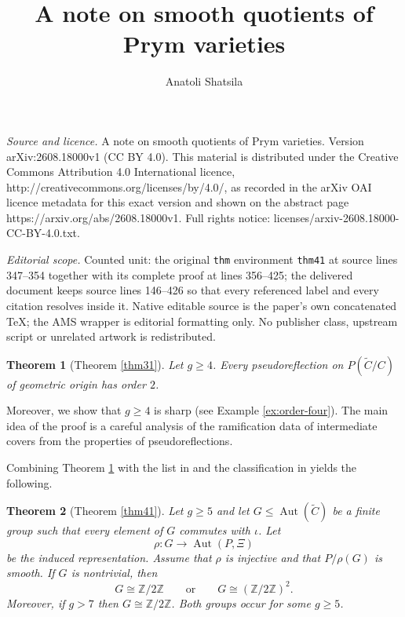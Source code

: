 \documentclass[10pt,a4paper]{amsart}
\newtheorem{thm}{Theorem}[section]
\numberwithin{equation}{section}
\newcommand{\ZZ}{\mathbb Z}
\DeclareMathOperator{\Aut}{Aut}
\begin{document}
\title[A note on smooth quotients of Prym varieties]{A note on smooth quotients of Prym varieties}
\author{Anatoli Shatsila}
\date{}
\maketitle
\noindent\emph{Source and licence.} A note on smooth quotients of Prym varieties. Version arXiv:2608.18000v1 (CC BY 4.0). This material is distributed under the Creative Commons Attribution 4.0 International licence, http://creativecommons.org/licenses/by/4.0/, as recorded in the arXiv OAI licence metadata for this exact version and shown on the abstract page https://arxiv.org/abs/2608.18000v1. Full rights notice: licenses/arxiv-2608.18000-CC-BY-4.0.txt.\par\smallskip
\noindent\textit{Editorial scope.} Counted unit: the original \texttt{thm} environment \texttt{thm41} at source lines 347--354 together with its complete proof at lines 356--425; the delivered document keeps source lines 146--426 so that every referenced label and every citation resolves inside it. Native editable source is the paper's own concatenated TeX; the AMS wrapper is editorial formatting only. No publisher class, upstream script or unrelated artwork is redistributed.
\begin{thm}[Theorem \ref{thm31}]\label{thm:order-two}
Let $g\geq4$. Every pseudoreflection on $P(\widetilde C/C)$ of geometric origin has order $2$.
\end{thm}

Moreover, we show that $g \geq 4$ is sharp (see Example \ref{ex:order-four}). The main idea of the proof is a careful analysis of the ramification data of intermediate covers from the properties of pseudoreflections.  

Combining Theorem \ref{thm:order-two} with the list in \cite[Proposition 5.1]{ALN} and the classification in \cite[Theorem 3.5]{ALA} yields the following.

\begin{thm}[Theorem \ref{thm41}]\label{thm:main}
Let $g\geq5$ and let $G\leq \Aut(\widetilde C)$ be a finite group such that every element of $G$ commutes with $\iota$. Let
\[
\rho\colon G\longrightarrow \Aut(P,\Xi)
\]
be the induced representation. Assume that $\rho$ is injective and that $P/\rho(G)$ is smooth. If $G$ is nontrivial, then $$ G\cong \ZZ/2\ZZ \qquad\text{or}\qquad G\cong (\ZZ/2\ZZ)^2.$$
Moreover, if $g > 7$ then $G\cong \ZZ/2\ZZ$. 
Both groups occur for some $g \geq 5$.
\end{thm}
\end{document}
